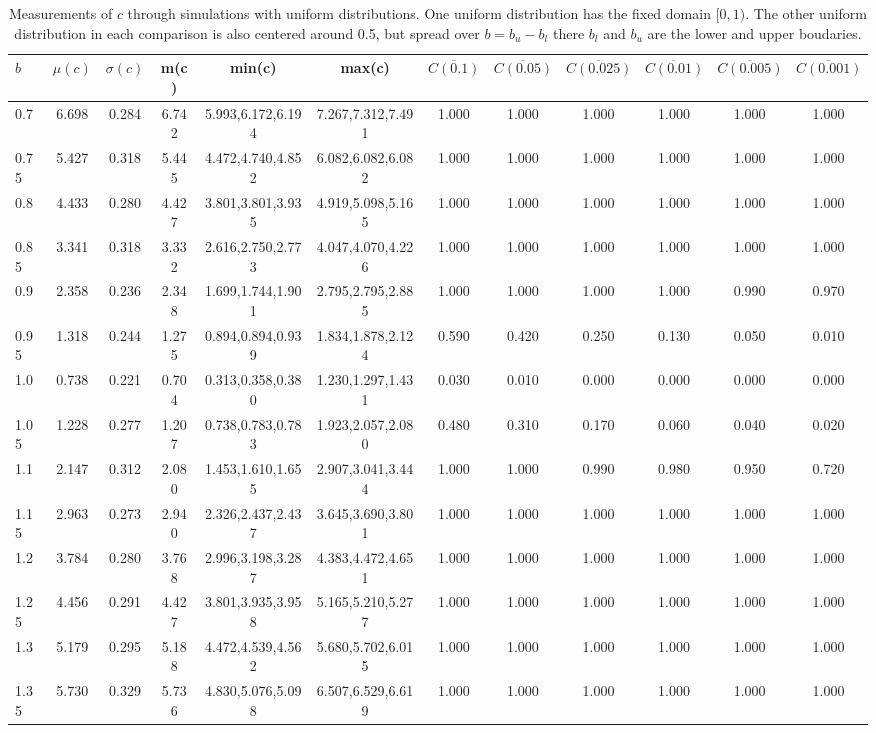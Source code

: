 \begin{table*}[h!]
\begin{center}
\begin{tabular}{| l | c | c | c | c | c | c | c | c | c | c | c |}\hline
$b$ & $\mu(c)$ & $\sigma(c)$ & m(c) & min(c) & max(c) & $\overline{C(0.1)}$ & $\overline{C(0.05)}$ & $\overline{C(0.025)}$ & $\overline{C(0.01)}$ & $\overline{C(0.005)}$ & $\overline{C(0.001)}$ \\\hline
0.7 & 6.698 & 0.284 & 6.742 & 5.993,6.172,6.194 & 7.267,7.312,7.491  & 1.000  & 1.000  & 1.000  & 1.000  & 1.000  & 1.000 \\\hline
0.75 & 5.427 & 0.318 & 5.445 & 4.472,4.740,4.852 & 6.082,6.082,6.082  & 1.000  & 1.000  & 1.000  & 1.000  & 1.000  & 1.000 \\\hline
0.8 & 4.433 & 0.280 & 4.427 & 3.801,3.801,3.935 & 4.919,5.098,5.165  & 1.000  & 1.000  & 1.000  & 1.000  & 1.000  & 1.000 \\\hline
0.85 & 3.341 & 0.318 & 3.332 & 2.616,2.750,2.773 & 4.047,4.070,4.226  & 1.000  & 1.000  & 1.000  & 1.000  & 1.000  & 1.000 \\\hline
0.9 & 2.358 & 0.236 & 2.348 & 1.699,1.744,1.901 & 2.795,2.795,2.885  & 1.000  & 1.000  & 1.000  & 1.000  & 0.990  & 0.970 \\\hline
0.95 & 1.318 & 0.244 & 1.275 & 0.894,0.894,0.939 & 1.834,1.878,2.124  & 0.590  & 0.420  & 0.250  & 0.130  & 0.050  & 0.010 \\\hline
1.0 & 0.738 & 0.221 & 0.704 & 0.313,0.358,0.380 & 1.230,1.297,1.431  & 0.030  & 0.010  & 0.000  & 0.000  & 0.000  & 0.000 \\\hline
1.05 & 1.228 & 0.277 & 1.207 & 0.738,0.783,0.783 & 1.923,2.057,2.080  & 0.480  & 0.310  & 0.170  & 0.060  & 0.040  & 0.020 \\\hline
1.1 & 2.147 & 0.312 & 2.080 & 1.453,1.610,1.655 & 2.907,3.041,3.444  & 1.000  & 1.000  & 0.990  & 0.980  & 0.950  & 0.720 \\\hline
1.15 & 2.963 & 0.273 & 2.940 & 2.326,2.437,2.437 & 3.645,3.690,3.801  & 1.000  & 1.000  & 1.000  & 1.000  & 1.000  & 1.000 \\\hline
1.2 & 3.784 & 0.280 & 3.768 & 2.996,3.198,3.287 & 4.383,4.472,4.651  & 1.000  & 1.000  & 1.000  & 1.000  & 1.000  & 1.000 \\\hline
1.25 & 4.456 & 0.291 & 4.427 & 3.801,3.935,3.958 & 5.165,5.210,5.277  & 1.000  & 1.000  & 1.000  & 1.000  & 1.000  & 1.000 \\\hline
1.3 & 5.179 & 0.295 & 5.188 & 4.472,4.539,4.562 & 5.680,5.702,6.015  & 1.000  & 1.000  & 1.000  & 1.000  & 1.000  & 1.000 \\\hline
1.35 & 5.730 & 0.329 & 5.736 & 4.830,5.076,5.098 & 6.507,6.529,6.619  & 1.000  & 1.000  & 1.000  & 1.000  & 1.000  & 1.000 \\\hline
\end{tabular}
\caption{Measurements of $c$ through simulations
with uniform distributions.
One uniform distribution has the fixed domain $[0,1)$.
The other uniform distribution in each comparison
is also centered around 0.5,
but spread over $b=b_u-b_l$ there $b_l$ and $b_u$ are the lower and upper boudaries.}
\end{center}
\end{table*}